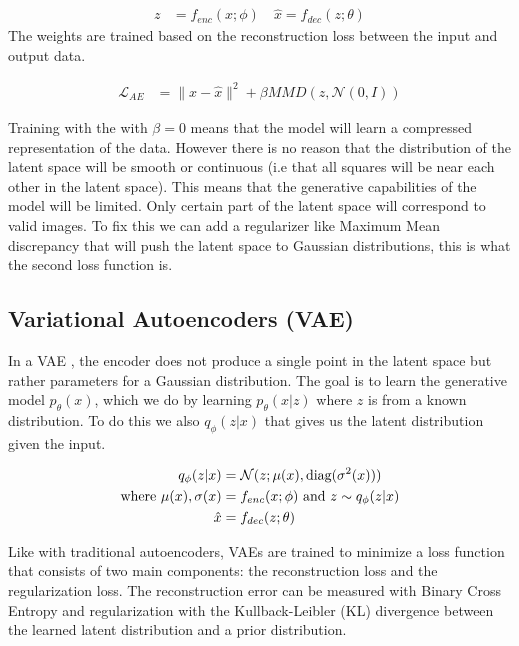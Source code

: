 \documentclass[conference,a4paper]{IEEEtran}
\begin{document}
\begin{align}
z &= f_{enc}(x; \phi) \quad \hat{x} = f_{dec}(z; \theta)
\end{align}
The weights are trained based on the reconstruction loss between the input and output data.

\begin{align}
\mathcal{L}_{AE} &= \| x - \hat{x} \|^2 + \beta MMD(z, \mathcal{N}(0, I))
\end{align}

Training with the with $\beta=0$ means that the model will learn a compressed representation of the data. However there is no reason that the distribution of the latent space will be smooth or continuous (i.e that all squares will be near each other in the latent space). This means that the generative capabilities of the model will be limited. Only certain part of the latent space will correspond to valid images. To fix this we can add a regularizer like Maximum Mean discrepancy \cite{grettonKernelMethodTwoSample2008} that will push the latent space to Gaussian distributions, this is what the second loss function is.

\subsection{Variational Autoencoders (VAE)}

In a VAE \cite{kingmaAutoEncodingVariationalBayes2022}, the encoder does not produce a single point in the latent space but rather parameters for a Gaussian distribution. The goal is to learn the generative model $p_\theta(x)$, which we do by learning $p_\theta(x|z)$ where $z$ is from a known distribution. To do this we also  $q_\phi(z|x)$ that gives us the latent distribution given the input.

\begin{align}
q_\phi(z|x) &= \mathcal{N}(z; \mu(x),\text{diag}(\sigma^2(x)))\\
\text{where } \mu(x), \sigma(x) &= f_{enc}(x; \phi) \text{ and } z \sim q_\phi(z|x) \notag\\
\hat{x} &= f_{dec}(z; \theta)
\end{align}

Like with traditional autoencoders, VAEs are trained to minimize a loss function that consists of two main components: the reconstruction loss and the regularization loss. The reconstruction error can be measured with Binary Cross Entropy and regularization with the Kullback-Leibler (KL) \cite{kullbackInformationSufficiency1951} divergence between the learned latent distribution and a prior distribution.
\end{document}
